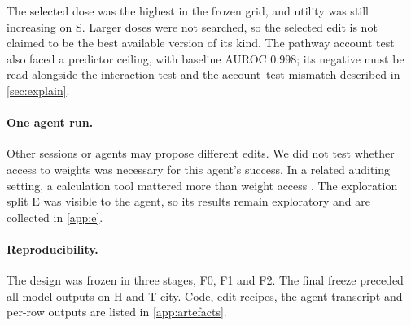 The selected dose was the highest in the frozen grid, and utility was still increasing on S. Larger doses
were not searched, so the selected edit is not claimed to be the best available version of its kind.
The pathway account test also faced a predictor ceiling, with baseline AUROC 0.998; its negative must be
read alongside the interaction test and the account--test mismatch described in \cref{sec:explain}.

\paragraph{One agent run.}
Other sessions or agents may propose different edits. We did not test whether access to weights was necessary
for this agent's success. In a related auditing setting, a calculation tool mattered more than weight access
\citep{liu2026auditors}. The exploration split E was visible to the agent, so its results remain exploratory
and are collected in \cref{app:e}.

\paragraph{Reproducibility.}
The design was frozen in three stages, F0, F1 and F2. The final freeze preceded all model outputs on H and
T-city. Code, edit recipes, the agent transcript and per-row outputs are listed in \cref{app:artefacts}.
